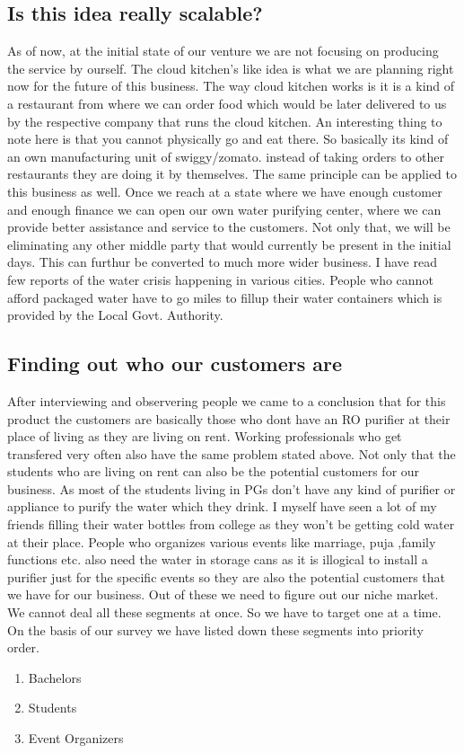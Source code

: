 \documentclass[a4paper, 12pt]{report}
\begin{document}
\subsection*{Is this idea really scalable?}
As of now, at the initial state of our venture we are not focusing on producing the service by ourself. The cloud kitchen's like idea is what we are planning right now
for the future of this business. The way cloud kitchen works is it is a kind of a restaurant from where we can order food which would be later delivered to us by the 
respective company that runs the cloud kitchen. An interesting thing to note here is that you cannot physically go and eat there. So basically its kind of an own manufacturing
unit of swiggy/zomato. instead of taking orders to other restaurants they are doing it by themselves. The same principle can be applied to this business as well. Once
we reach at a state where we have enough customer and enough finance we can open our own water purifying center, where we can provide better assistance and service to the
customers. Not only that, we will be eliminating any other middle party that would currently be present in the initial days. This can furthur be converted to much more 
wider business. I have read few reports of the water crisis happening in various cities. People who cannot afford packaged water have to go miles to fillup their water containers
which is provided by the Local Govt. Authority. 

\subsection{Finding out who our customers are}
After interviewing and observering people we came to a conclusion that for this product the customers are basically those
who dont have an RO purifier at their place of living as they are living on rent. Working professionals who get transfered
very often also have the same problem stated above. Not only that the students who are living on rent can also be the 
potential customers for our business. As most of the students living in PGs don't have any kind of purifier or 
appliance to purify the water which they drink. I myself have seen a lot of my friends filling their water bottles from 
college as they won't be getting cold water at their place. People who organizes various events like marriage, puja
,family functions etc. also need the water in storage cans as it is illogical to install a purifier just for the specific events
so they are also the potential customers that we have for our business. Out of these we need to figure out our niche market.
We cannot deal all these segments at once. So we have to target one at a time. On the basis of our survey we have listed down
these segments into priority order.
\begin{enumerate}
    \item Bachelors
    \item Students
    \item Event Organizers
\end{enumerate} 
\end{document}

